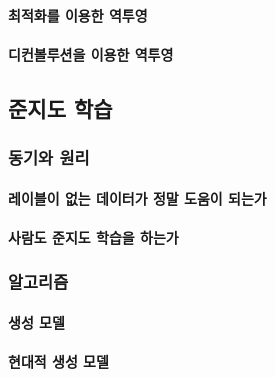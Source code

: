 \documentclass [12pt] {oblivoir}
\let\oldsubsubsection=\subsubsection
\renewcommand{\subsubsection}
{
  \filbreak
  \oldsubsubsection
}
\begin{document}
\paragraph*{최적화를 이용한 역투영}\mbox{}

\vspace{3mm}

\paragraph*{디컨볼루션을 이용한 역투영}\mbox{}

\vspace{3mm}

\subsection{준지도 학습}

\subsubsection{동기와 원리}

\paragraph*{레이블이 없는 데이터가 정말 도움이 되는가}\mbox{}

\vspace{3mm}

\paragraph*{사람도 준지도 학습을 하는가}\mbox{}

\vspace{3mm}

\subsubsection{알고리즘}

\paragraph*{생성 모델}\mbox{}

\vspace{3mm}

\paragraph*{현대적 생성 모델}\mbox{}
\end{document}

